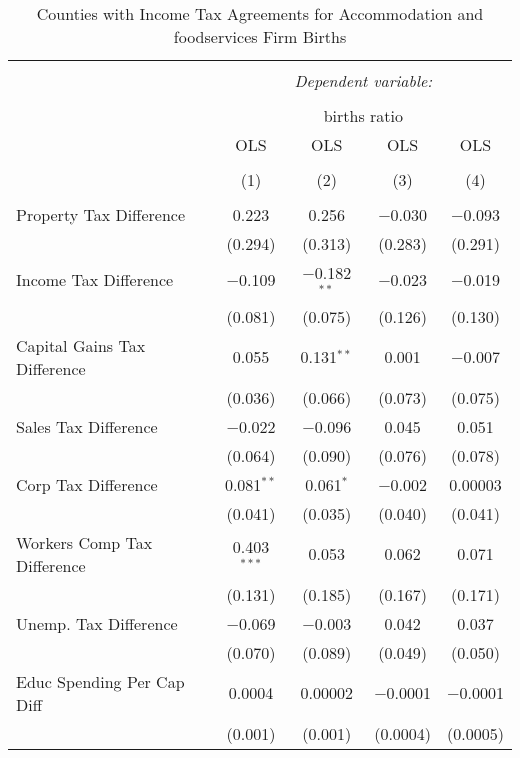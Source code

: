 
\begin{table}[!htbp] \centering 
  \caption{Counties with Income Tax Agreements for  Accommodation and foodservices Firm Births} 
  \label{72rd} 
\begin{tabular}{@{\extracolsep{5pt}}lcccc} 
\\[-1.8ex]\hline 
\hline \\[-1.8ex] 
 & \multicolumn{4}{c}{\textit{Dependent variable:}} \\ 
\cline{2-5} 
\\[-1.8ex] & \multicolumn{4}{c}{births ratio} \\ 
 & OLS & OLS & OLS & OLS \\ 
\\[-1.8ex] & (1) & (2) & (3) & (4)\\ 
\hline \\[-1.8ex] 
 Property Tax Difference & 0.223 & 0.256 & $-$0.030 & $-$0.093 \\ 
  & (0.294) & (0.313) & (0.283) & (0.291) \\ 
  Income Tax Difference & $-$0.109 & $-$0.182$^{**}$ & $-$0.023 & $-$0.019 \\ 
  & (0.081) & (0.075) & (0.126) & (0.130) \\ 
  Capital Gains Tax Difference & 0.055 & 0.131$^{**}$ & 0.001 & $-$0.007 \\ 
  & (0.036) & (0.066) & (0.073) & (0.075) \\ 
  Sales Tax Difference & $-$0.022 & $-$0.096 & 0.045 & 0.051 \\ 
  & (0.064) & (0.090) & (0.076) & (0.078) \\ 
  Corp Tax Difference & 0.081$^{**}$ & 0.061$^{*}$ & $-$0.002 & 0.00003 \\ 
  & (0.041) & (0.035) & (0.040) & (0.041) \\ 
  Workers Comp Tax Difference & 0.403$^{***}$ & 0.053 & 0.062 & 0.071 \\ 
  & (0.131) & (0.185) & (0.167) & (0.171) \\ 
  Unemp. Tax Difference & $-$0.069 & $-$0.003 & 0.042 & 0.037 \\ 
  & (0.070) & (0.089) & (0.049) & (0.050) \\ 
  Educ Spending Per Cap Diff & 0.0004 & 0.00002 & $-$0.0001 & $-$0.0001 \\ 
  & (0.001) & (0.001) & (0.0004) & (0.0005) \\ 

\end{tabular}
\end{table}
